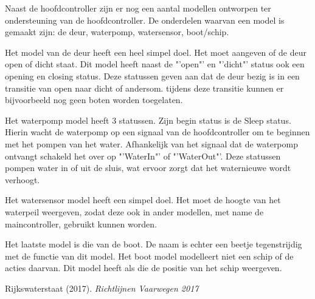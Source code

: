 \documentclass{article}
\begin{document}
Naast de hoofdcontroller zijn er nog een aantal modellen ontworpen ter ondersteuning van de hoofdcontroller. De onderdelen waarvan een model is gemaakt zijn: de deur, waterpomp, watersensor, boot/schip.


\vskip0.5cm

Het model van de deur heeft een heel simpel doel. Het moet aangeven of de deur open of dicht staat. Dit model heeft naast de "'open"' en "'dicht"' status ook een opening en closing status. Deze statussen geven aan dat de deur bezig is in een transitie van open naar dicht of andersom. tijdens deze transitie kunnen er bijvoorbeeld nog geen boten worden toegelaten.

\vskip0.5cm

Het waterpomp model heeft 3 statussen. Zijn begin status is de Sleep status. Hierin wacht de waterpomp op een signaal van de hoofdcontroller om te beginnen met het pompen van het water. Afhankelijk van het signaal dat de waterpomp ontvangt schakeld het over op "'WaterIn"' of "'WaterOut"'. Deze statussen pompen water in of uit de sluis, wat ervoor zorgt dat het waternieuwe wordt verhoogt.

Het watersensor model heeft een simpel doel. Het moet de hoogte van het waterpeil weergeven, zodat deze ook in ander modellen, met name de maincontroller, gebruikt kunnen worden.

Het laatste model is die van de boot. De naam is echter een beetje tegenstrijdig met de functie van dit model. Het boot model modelleert niet een schip of de acties daarvan. Dit model heeft als die de positie van het schip weergeven.



\clearpage %

\clearpage %
\begin{thebibliography}{9}
Rijkswaterstaat (2017).
\textit{Richtlijnen Vaarwegen 2017}\\

\end{thebibliography}
\end{document}
